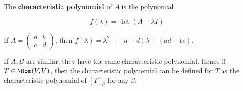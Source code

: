 \documentclass[11pt]{scrartcl}
\begin{document}
\begin{definition}
  The \textbf{characteristic polynomial} of \(A\) is the polynomial

  \begin{equation*}
    f(\lambda) = \det (A-\lambda I)
  \end{equation*}

\end{definition}
\begin{example}
  If \(A = \begin{pmatrix}
    a & b\\
    c & d
  \end{pmatrix}\), then \(f(\lambda) = \lambda^{2} -(a+d)\lambda + (ad - bc)\).
\end{example}

\begin{remark}
  If \(A, B\) are similar, they have the same characteristic
  polynomial. Hence if \(T\in \Hom(V,V)\), then the characteristic
  polynomial can be defined for \(T\) as the characteristic polynomial
  of \([T]_{\beta}\) for any \(\beta\).
\end{remark}
\end{document}
